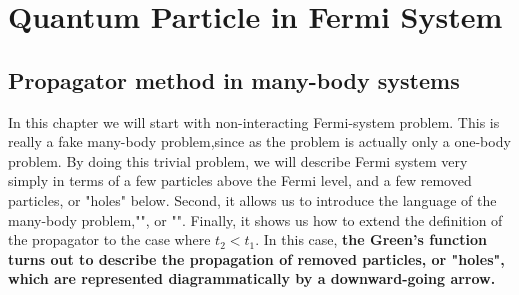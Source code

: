 \section{Quantum Particle in Fermi System}
\subsection{Propagator method in many-body systems}
In this chapter we will start with non-interacting Fermi-system problem. This is really a fake many-body problem,since as the problem is actually only a one-body problem. By doing this trivial problem, we will describe Fermi system very simply in terms of a few particles above the Fermi level, and a few removed particles, or "holes" below. Second, it allows us to introduce the language of the many-body problem,"", or "". Finally, it shows us how to extend the definition of the propagator to the case where $t_2<t_1$. In this case, \textbf{the Green's function turns out to describe the propagation of removed particles, or "holes", which are represented diagrammatically by a downward-going arrow.}

